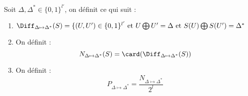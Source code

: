 \documentclass[a4paper, 10pt]{thesis}
\begin{document}
\begin{df}
    Soit $\Delta, \Delta^* \in \{0,1\}^{l'}$, on définit ce qui suit :
    \begin{enumerate}
        \item $\Diff_{\Delta \mapsto \Delta^*}(S) = \{(U, U') \in \{0, 1\}^{l'} \mbox{ et } U
                \bigoplus U' = \Delta \mbox{ et } S(U) \bigoplus S(U') = \Delta^*$
        \item On définit : \begin{displaymath}
                N_{\Delta \mapsto \Delta^*}(S) = \card(\Diff_{\Delta \mapsto \Delta^*}(S))
            \end{displaymath}
        \item On définit : \begin{displaymath}
                P_{\Delta \mapsto \Delta^*} = \frac{N_{\Delta \mapsto \Delta^*}}{2^l}
            \end{displaymath}
    \end{enumerate}
\end{df}
\end{document}
